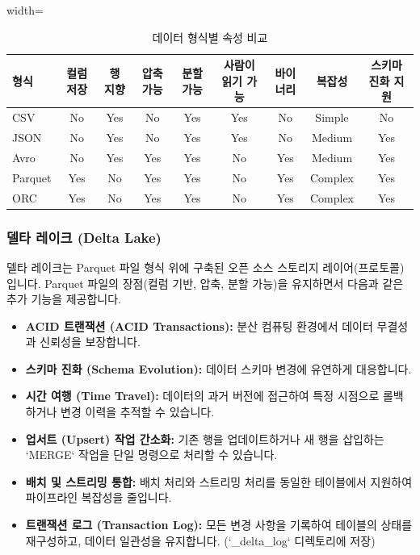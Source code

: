 \documentclass[11pt,a4paper]{article}
\begin{document}
\begin{table}[h!]
\centering
\caption{데이터 형식별 속성 비교}
\label{tab:data_format_properties}
\begin{adjustbox}{width=\textwidth}
\begin{tabular}{lcccccccc}
\toprule
\textbf{형식} & \textbf{컬럼 저장} & \textbf{행 지향} & \textbf{압축 가능} & \textbf{분할 가능} & \textbf{사람이 읽기 가능} & \textbf{바이너리} & \textbf{복잡성} & \textbf{스키마 진화 지원} \\
\midrule
CSV & No & Yes & No & Yes & Yes & No & Simple & No \\
JSON & No & Yes & No & Yes & Yes & No & Medium & Yes \\
Avro & No & Yes & Yes & Yes & No & Yes & Medium & Yes \\
Parquet & Yes & No & Yes & Yes & No & Yes & Complex & Yes \\
ORC & Yes & No & Yes & Yes & No & Yes & Complex & Yes \\
\bottomrule
\end{tabular}
\end{adjustbox}
\end{table}

\subsubsection{델타 레이크 (Delta Lake)}
델타 레이크는 Parquet 파일 형식 위에 구축된 오픈 소스 스토리지 레이어(프로토콜)입니다. Parquet 파일의 장점(컬럼 기반, 압축, 분할 가능)을 유지하면서 다음과 같은 추가 기능을 제공합니다.

\begin{itemize}
    \item \textbf{ACID 트랜잭션 (ACID Transactions):} 분산 컴퓨팅 환경에서 데이터 무결성과 신뢰성을 보장합니다.
    \item \textbf{스키마 진화 (Schema Evolution):} 데이터 스키마 변경에 유연하게 대응합니다.
    \item \textbf{시간 여행 (Time Travel):} 데이터의 과거 버전에 접근하여 특정 시점으로 롤백하거나 변경 이력을 추적할 수 있습니다.
    \item \textbf{업서트 (Upsert) 작업 간소화:} 기존 행을 업데이트하거나 새 행을 삽입하는 `MERGE` 작업을 단일 명령으로 처리할 수 있습니다.
    \item \textbf{배치 및 스트리밍 통합:} 배치 처리와 스트리밍 처리를 동일한 테이블에서 지원하여 파이프라인 복잡성을 줄입니다.
    \item \textbf{트랜잭션 로그 (Transaction Log):} 모든 변경 사항을 기록하여 테이블의 상태를 재구성하고, 데이터 일관성을 유지합니다. (`_delta_log` 디렉토리에 저장)
\end{itemize}
\end{document}

